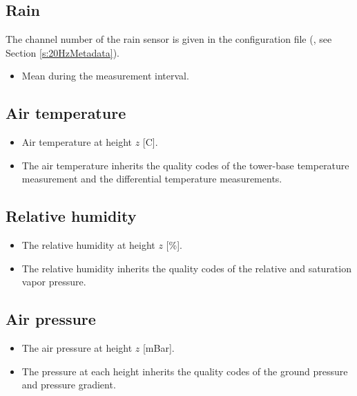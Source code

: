 \subsection{Rain} 
The channel number of the rain sensor is given in the configuration file (, see Section \ref{s:20HzMetadata}).
\begin{itemize}
\item {} Mean during the measurement interval.
\end{itemize}

\subsection{Air temperature} 
\begin{itemize}
\item {} Air temperature at height $z$ [\degree C]. 
\item {} The air temperature inherits the quality codes of the tower-base temperature measurement and the differential temperature measurements.
\end{itemize}

\subsection{Relative humidity} 
\begin{itemize}
\item {} The relative humidity at height $z$ [\%]. 
\item {} The relative humidity inherits the quality codes of the relative and saturation vapor pressure.
\end{itemize}

\subsection{Air pressure} 
\begin{itemize}
\item {} The air pressure at height $z$ [mBar]. 
\item {}  The pressure at each height inherits the quality codes of the ground pressure and pressure gradient.
\end{itemize}

